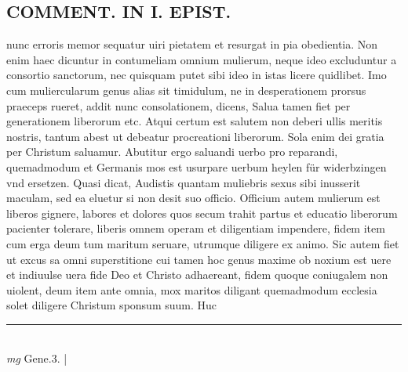 \documentclass{article}
\begin{document}
\begin{pages}
\section*{COMMENT. IN I. EPIST. }\pstart nunc erroris memor sequatur uiri pietatem et resurgat in pia obedientia. Non enim haec dicuntur in contumeliam omnium mulierum, neque ideo excluduntur a consortio sanctorum, nec quisquam putet sibi ideo in istas licere quidlibet. Imo cum muliercularum genus alias sit timidulum, ne in desperationem prorsus praeceps rueret, addit nunc consolationem, dicens, Salua tamen fiet per generationem liberorum etc. Atqui certum est salutem non deberi ullis meritis nostris, tantum abest ut debeatur procreationi liberorum. Sola enim dei gratia per Christum saluamur. Abutitur ergo saluandi uerbo pro reparandi, quemadmodum et Germanis mos est usurpare uerbum heylen für widerbzingen vnd ersetzen. Quasi dicat, Audistis quantam muliebris sexus sibi inusserit maculam, sed ea eluetur si non desit suo officio. Officium autem mulierum est liberos gignere, labores et dolores quos secum trahit partus et educatio liberorum pacienter tolerare, liberis omnem operam et diligentiam impendere, fidem item cum erga deum tum maritum seruare, utrumque diligere ex animo. Sic autem fiet ut excus sa omni superstitione cui tamen hoc genus maxime ob noxium est uere et indiuulse uera fide Deo et Christo adhaereant, fidem quoque coniugalem non uiolent, deum item ante omnia, mox maritos diligant quemadmodum ecclesia solet diligere Christum sponsum suum. Huc  \pend
\vspace{0.5cm}\noindent
\vspace{0.2cm}\rule{1cm}{0.2pt}\\ 
\hspace{0.2cm}\textit{mg}
\footnotesize Gene.3. 
\normalsize| 

\end{pages}
\end{document}
